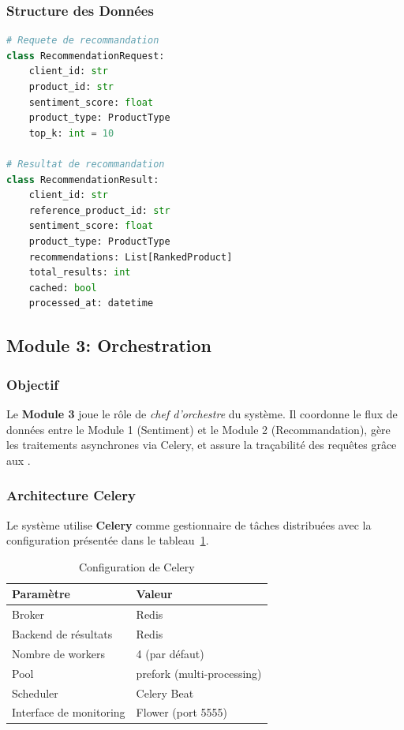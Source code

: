 \documentclass[11pt,a4paper]{report}
\begin{document}
\subsubsection{Structure des Données}

\begin{lstlisting}[language=Python, caption={Structure de la requête et du résultat de recommandation}, label={lst:recommendation_structures}]
# Requete de recommandation
class RecommendationRequest:
    client_id: str
    product_id: str
    sentiment_score: float
    product_type: ProductType
    top_k: int = 10

# Resultat de recommandation
class RecommendationResult:
    client_id: str
    reference_product_id: str
    sentiment_score: float
    product_type: ProductType
    recommendations: List[RankedProduct]
    total_results: int
    cached: bool
    processed_at: datetime
\end{lstlisting}

\subsection{Module 3: Orchestration}
\label{subsec:module3_orchestration}

\subsubsection{Objectif}
Le \textbf{Module 3} joue le rôle de \textit{chef d'orchestre} du système. Il coordonne le flux de données entre le Module 1 (Sentiment) et le Module 2 (Recommandation), gère les traitements asynchrones via Celery, et assure la traçabilité des requêtes grâce aux .

\subsubsection{Architecture Celery}

Le système utilise \textbf{Celery} comme gestionnaire de tâches distribuées avec la configuration présentée dans le tableau~\ref{tab:celery_config}.

\begin{table}[H]
    \centering
    \caption{Configuration de Celery}
    \label{tab:celery_config}
    \begin{tabular}{|l|l|}
        \hline
        \textbf{Paramètre} & \textbf{Valeur} \\
        \hline
        Broker & Redis \\
        Backend de résultats & Redis \\
        Nombre de workers & 4 (par défaut) \\
        Pool & prefork (multi-processing) \\
        Scheduler & Celery Beat \\
        Interface de monitoring & Flower (port 5555) \\
        \hline
    \end{tabular}
\end{table}
\end{document}
